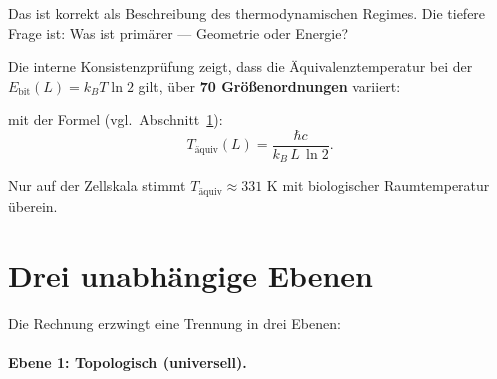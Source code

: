 Das ist korrekt als Beschreibung des thermodynamischen Regimes.
Die tiefere Frage ist: Was ist primärer — Geometrie oder Energie?

Die interne Konsistenzprüfung zeigt, dass die Äquivalenztemperatur
bei der \(E_\text{bit}(L) = k_B T \ln 2\) gilt,
über \textbf{70 Größenordnungen} variiert:

\begin{center}
\renewcommand{\arraystretch}{1.4}
\end{center}

mit der Formel (vgl.\ Abschnitt~\ref{sec:drei}):
\begin{equation}
  T_\text{äquiv}(L) = \frac{\hbar c}{k_B \, L \, \ln 2}.
  \label{eq:Taequiv}
\end{equation}

Nur auf der Zellskala stimmt \(T_\text{äquiv} \approx 331\) K
mit biologischer Raumtemperatur überein.

\section{Drei unabhängige Ebenen}
\label{sec:drei}

Die Rechnung erzwingt eine Trennung in drei Ebenen:

\paragraph{Ebene 1: Topologisch (universell).}

